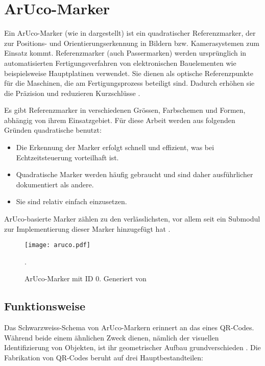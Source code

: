 \section{ArUco-Marker}
\label{sec:aruco}
Ein ArUco-Marker (wie in  dargestellt) ist ein quadratischer Referenzmarker, der zur Positions- und Orientierungserkennung in Bildern bzw. Kamerasystemen zum Einsatz kommt.
Referenzmarker (auch Passermarken) werden ursprünglich in automatisierten Fertigungsverfahren von elektronischen Bauelementen wie beispielsweise Hauptplatinen verwendet.
Sie dienen als optische Referenzpunkte für die Maschinen, die am Fertigungsprozess beteiligt sind.
Dadurch erhöhen sie die Präzision und reduzieren Kurzschlüsse \cite{Wiki:Passermarke}.

Es gibt Referenzmarker in verschiedenen Grössen, Farbschemen und Formen, abhängig von ihrem Einsatzgebiet.
Für diese Arbeit werden aus folgenden Gründen quadratische benutzt:

\begin{itemize}
    \item Die Erkennung der Marker erfolgt schnell und effizient, was bei Echtzeitsteuerung vorteilhaft ist.
    \item Quadratische Marker werden häufig gebraucht und sind daher ausführlicher dokumentiert als andere.
    \item Sie sind relativ einfach einzusetzen.
\end{itemize}

ArUco-basierte Marker zählen zu den verlässlichsten, vor allem seit  ein Submodul zur Implementierung dieser Marker hinzugefügt hat \cite{IJ:fiducial}.

\begin{figure}[H]
    \centering
        \texttt{[image: aruco.pdf]}
    \caption{ArUco-Marker mit ID 0. Generiert von \cite{chev:arucogen}}.
        \label{pic:marker0}
\end{figure}

\subsection{Funktionsweise}
Das Schwarzweiss-Schema von ArUco-Markern erinnert an das eines QR-Codes.
Während beide einem ähnlichen Zweck dienen, nämlich der visuellen Identifizierung von Objekten, ist ihr geometrischer Aufbau grundverschieden \cite{ten:qrcode}.
Die Fabrikation von QR-Codes beruht auf drei Hauptbestandteilen:

